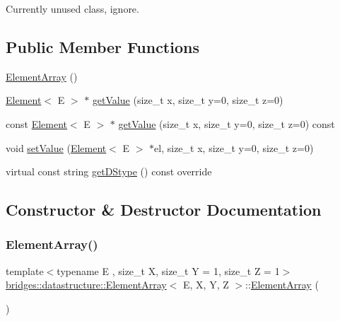 Currently unused class, ignore. \subsection*{Public Member Functions}
\begin{DoxyCompactItemize}
\item 
\mbox{\hyperlink{classbridges_1_1datastructure_1_1_element_array_ae86caf35a947e3b34a2d2bd421e414eb}{Element\+Array}} ()
\item 
\mbox{\hyperlink{classbridges_1_1datastructure_1_1_element}{Element}}$<$ E $>$ $\ast$ \mbox{\hyperlink{classbridges_1_1datastructure_1_1_element_array_a383d08e16eeeb06217d030ed2b18fb37}{get\+Value}} (size\+\_\+t x, size\+\_\+t y=0, size\+\_\+t z=0)
\item 
const \mbox{\hyperlink{classbridges_1_1datastructure_1_1_element}{Element}}$<$ E $>$ $\ast$ \mbox{\hyperlink{classbridges_1_1datastructure_1_1_element_array_a1b05a90e5611a83a4a0c2b535d134303}{get\+Value}} (size\+\_\+t x, size\+\_\+t y=0, size\+\_\+t z=0) const
\item 
void \mbox{\hyperlink{classbridges_1_1datastructure_1_1_element_array_aecd1e6ae5a15c74837f2bfe9d7fbeb60}{set\+Value}} (\mbox{\hyperlink{classbridges_1_1datastructure_1_1_element}{Element}}$<$ E $>$ $\ast$el, size\+\_\+t x, size\+\_\+t y=0, size\+\_\+t z=0)
\item 
virtual const string \mbox{\hyperlink{classbridges_1_1datastructure_1_1_element_array_a22d8c37e88616105cdb7c755f99fdb20}{get\+D\+Stype}} () const override
\end{DoxyCompactItemize}


\subsection{Constructor \& Destructor Documentation}
\mbox{\label{classbridges_1_1datastructure_1_1_element_array_ae86caf35a947e3b34a2d2bd421e414eb}} 
\subsubsection{\texorpdfstring{Element\+Array()}{ElementArray()}}
{\footnotesize\ttfamily template$<$typename E , size\+\_\+t X, size\+\_\+t Y = 1, size\+\_\+t Z = 1$>$ \\
\mbox{\hyperlink{classbridges_1_1datastructure_1_1_element_array}{bridges\+::datastructure\+::\+Element\+Array}}$<$ E, X, Y, Z $>$\+::\mbox{\hyperlink{classbridges_1_1datastructure_1_1_element_array}{Element\+Array}} (\begin{DoxyParamCaption}{ }\end{DoxyParamCaption})\hspace{0.3cm}{\ttfamily [inline]}}



